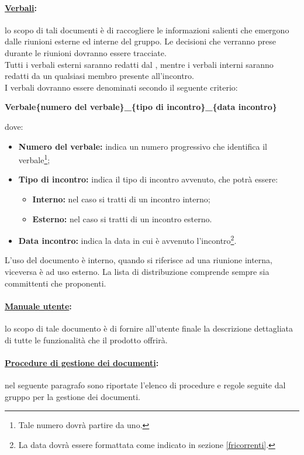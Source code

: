 \paragraph{\underline{Verbali}:} lo scopo di tali documenti è di raccogliere le informazioni salienti che emergono dalle riunioni esterne ed interne del gruppo. Le decisioni che verranno prese durante le riunioni dovranno essere tracciate.\\
Tutti i verbali esterni saranno redatti dal \projectManager{}, mentre i verbali interni saranno redatti da un qualsiasi membro presente all'incontro.
\\I verbali dovranno essere denominati secondo il seguente criterio:
\begin{center}
	\textbf{Verbale\{numero del verbale\}\_\{tipo di incontro\}\_\{data incontro\}}
\end{center}
dove:
\begin{itemize}
\item \textbf{Numero del verbale:} indica un numero progressivo che identifica il verbale\footnote{Tale numero dovrà partire da uno.};
\item \textbf{Tipo di incontro:} indica il tipo di incontro avvenuto, che potrà essere:
\begin{itemize}
\item \textbf{Interno:} nel caso si tratti di un incontro interno;
\item \textbf{Esterno:} nel caso si tratti di un incontro esterno.
\end{itemize}
\item \textbf{Data incontro:} indica la data in cui è avvenuto l'incontro\footnote{La data dovrà essere formattata come indicato in sezione \ref{fricorrenti}.}.
\end{itemize}
L'uso del documento è interno, quando si riferisce ad una riunione interna, viceversa è ad uso esterno. La lista di distribuzione comprende sempre sia committenti che proponenti.

\paragraph{\underline{Manuale utente}:} lo scopo di tale documento è di fornire all'utente finale la descrizione dettagliata di tutte le funzionalità che il prodotto offrirà.

\paragraph{\underline{Procedure di gestione dei documenti}:} nel seguente paragrafo sono riportate l'elenco di procedure e regole seguite dal gruppo \authorName{} per la gestione dei documenti.


